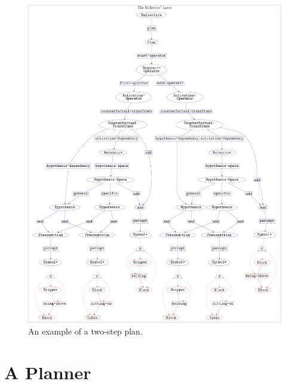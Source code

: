 \begin{figure}
\hspace*{-4cm}\includegraphics[width=18cm]{gfx/example_plan}
\caption[An example of a two-step plan.]{An example of a two-step
  plan.}
\label{figure:example_plan}
\end{figure}

\section{A Planner}

